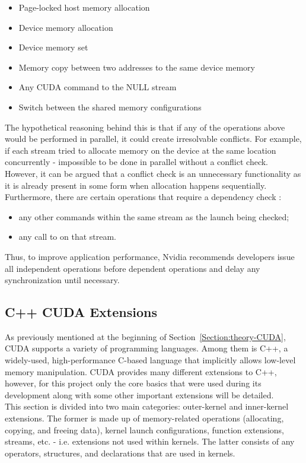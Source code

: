 \begin{itemize}
	\item Page-locked host memory allocation
	\item Device memory allocation
	\item Device memory set
	\item Memory copy between two addresses to the same device memory
	\item Any CUDA command to the NULL stream
	\item Switch between the shared memory configurations
\end{itemize}

The hypothetical reasoning behind this is that if any of the operations above would be performed in parallel, it could create irresolvable conflicts. For example, if each stream tried to allocate memory on the device at the same location concurrently - impossible to be done in parallel without a conflict check. However, it can be argued that a conflict check is an unnecessary functionality as it is already present in some form when allocation happens sequentially. \\
Furthermore, there are certain operations that require a dependency check \cite{NVIDIAMay2022}:

\begin{itemize}
	\item any other commands within the same stream as the launch being checked;
	\item any call to  on that stream.
\end{itemize}

Thus, to improve application performance, Nvidia recommends developers issue all independent operations before dependent operations and delay any synchronization until necessary.


\subsection{C++ CUDA Extensions}\label{Subsection:theory-CUDA-C++-extensions}
As previously mentioned at the beginning of Section~\ref{Section:theory-CUDA}, CUDA supports a variety of programming languages. Among them is C++, a widely-used, high-performance C-based language that implicitly allows low-level memory manipulation. CUDA provides many different extensions to C++, however, for this project only the core basics that were used during its development along with some other important extensions will be detailed. \\
This section is divided into two main categories: outer-kernel and inner-kernel extensions. The former is made up of memory-related operations (allocating, copying, and freeing data), kernel launch configurations, function extensions, streams, etc. - i.e. extensions not used within kernels. The latter consists of any operators, structures, and declarations that are used in kernels.


